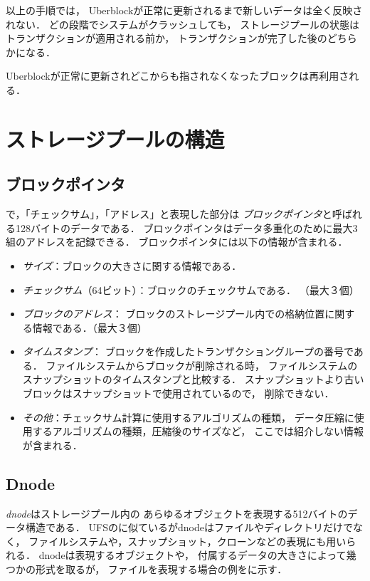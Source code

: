 以上の手順では，
Uberblockが正常に更新されるまで新しいデータは全く反映されない．
どの段階でシステムがクラッシュしても，
ストレージプールの状態はトランザクションが適用される前か，
トランザクションが完了した後のどちらかになる．

Uberblockが正常に更新されどこからも指されなくなったブロックは再利用される．

\section{ストレージプールの構造}

\subsection{ブロックポインタ}
で，「チェックサム」，「アドレス」と表現した部分は
\emph{ブロックポインタ}と呼ばれる128バイトのデータである．
ブロックポインタはデータ多重化のために最大3組のアドレスを記録できる．
ブロックポインタには以下の情報が含まれる．
\begin{itemize}
\item \emph{サイズ}：ブロックの大きさに関する情報である．
\item \emph{チェックサム}（64ビット）：ブロックのチェックサムである．
  （最大３個）
\item \emph{ブロックのアドレス}：
  ブロックのストレージプール内での格納位置に関する情報である．（最大３個）
\item \emph{タイムスタンプ}：
  ブロックを作成したトランザクショングループの番号である．
  ファイルシステムからブロックが削除される時，
  ファイルシステムのスナップショットのタイムスタンプと比較する．
  スナップショットより古いブロックはスナップショットで使用されているので，
  削除できない．
\item \emph{その他}：チェックサム計算に使用するアルゴリズムの種類，
  データ圧縮に使用するアルゴリズムの種類，圧縮後のサイズなど，
  ここでは紹介しない情報が含まれる．
\end{itemize}

\subsection{Dnode}
\emph{dnode}はストレージプール内の
あらゆるオブジェクトを表現する512バイトのデータ構造である．
UFSの{\inode}に似ているがdnodeはファイルやディレクトリだけでなく，
ファイルシステムや，スナップショット，クローンなどの表現にも用いられる．
dnodeは表現するオブジェクトや，
付属するデータの大きさによって幾つかの形式を取るが，
ファイルを表現する場合の例をに示す．

